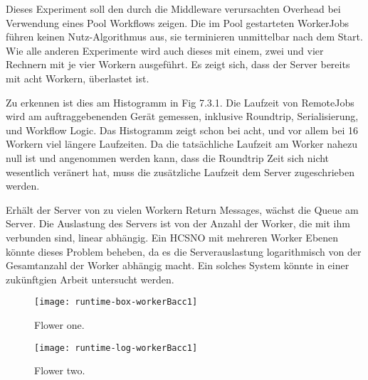 Dieses Experiment soll den durch die Middleware verursachten Overhead bei Verwendung eines Pool Workflows zeigen. Die im Pool gestarteten WorkerJobs führen keinen Nutz-Algorithmus aus, sie terminieren unmittelbar nach dem Start.
Wie alle anderen Experimente wird auch dieses mit einem, zwei und vier Rechnern mit je vier Workern ausgeführt. Es zeigt sich, dass der Server bereits mit acht Workern, überlastet ist.

Zu erkennen ist dies am Histogramm in Fig 7.3.1. Die Laufzeit von RemoteJobs wird am auftraggebenenden Gerät gemessen, inklusive Roundtrip, Serialisierung, und Workflow Logic. Das Histogramm zeigt schon bei acht, und vor allem bei 16 Workern viel längere Laufzeiten. Da die tatsächliche Laufzeit am Worker nahezu null ist und angenommen werden kann, dass die Roundtrip Zeit sich nicht wesentlich veränert hat, muss die zusätzliche Laufzeit dem Server zugeschrieben werden.

Erhält der Server von zu vielen Workern Return Messages, wächst die Queue am Server.
Die Auslastung des Servers ist von der Anzahl der Worker, die mit ihm verbunden sind, linear abhängig. Ein HCSNO mit mehreren Worker Ebenen könnte dieses Problem beheben, da es die Serverauslastung logarithmisch von der Gesamtanzahl der Worker abhängig macht. Ein solches System könnte in einer zukünftgien Arbeit untersucht werden.

\vspace{60mm}

\begin{figure}[H]
  \centering
  \begin{minipage}[b]{0.45\textwidth}
    \texttt{[image: runtime-box-workerBacc1]}
    \caption{Flower one.}
  \end{minipage}
  \hfill
  \begin{minipage}[b]{0.45\textwidth}
    \texttt{[image: runtime-log-workerBacc1]}
    \caption{Flower two.}
  \end{minipage}
\end{figure}

